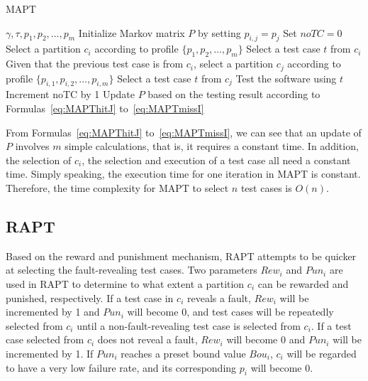 \documentclass[10pt,journal,compsoc]{IEEEtran}
\begin{document}
\begin{algorithm}
	\caption{MAPT}
	\label{alg:MAPT}
	\begin{algorithmic}[1]
		\renewcommand{\algorithmicrequire}{\textbf{Input:}}
		\renewcommand{\algorithmicensure}{\textbf{Output:}}
        
		\renewcommand{\algorithmicendwhile}{\algorithmicend\_\algorithmicwhile}
		\renewcommand{\algorithmicendfor}{\algorithmicend\_\algorithmicfor}
		\renewcommand{\algorithmicendif}{\algorithmicend\_\algorithmicif}
		\renewcommand{\algorithmicthen}{}
		\renewcommand{\algorithmicdo}{}
		\REQUIRE $\gamma, \tau, p_1, p_2, \ldots, p_m$
		\STATE Initialize Markov matrix $P$ by setting $p_{i,j} = p_j$
		\STATE Set $noTC = 0$
		\STATE Select a partition $c_i$ according to profile $\{p_1, p_2, \ldots, p_m\}$
		\STATE Select a test case $t$ from $c_i$
		\ELSE
		\STATE Given that the previous test case is from $c_i$, select a partition $c_j$ according to profile $\{p_{i,1}, p_{i,2}, \ldots, p_{i,m}\}$
		\STATE Select a test case $t$ from $c_j$
		\ENDIF
		\STATE Test the software using $t$
		\STATE Increment noTC by 1
		\STATE Update $P$ based on the testing result according to Formulas~\ref{eq:MAPThitJ} to~\ref{eq:MAPTmissI}
		\ENDWHILE
	\end{algorithmic}
\end{algorithm}

From Formulas~\ref{eq:MAPThitJ} to~\ref{eq:MAPTmissI}, we can see that an update of $P$ involves $m$ simple calculations, that is, it requires a constant time. In addition, the selection of $c_i$, the selection and execution of a test case all need a constant time. Simply speaking, the execution time for one iteration in MAPT is constant. Therefore, the time complexity for MAPT to select $n$ test cases is $O(n)$.

\subsection{RAPT}

Based on the reward and punishment mechanism, RAPT attempts to be quicker at selecting the fault-revealing test cases. Two parameters $Rew_i$ and $Pun_i$ are used in RAPT to determine to what extent a partition $c_i$ can be rewarded and punished, respectively. If a test case in $c_i$ reveals a fault, $Rew_i$ will be incremented by 1 and $Pun_i$ will become 0, and test cases will be repeatedly selected from $c_i$ until a non-fault-revealing test case is selected from $c_i$. If a test case selected from $c_i$ does not reveal a fault, $Rew_i$ will become 0 and $Pun_i$ will be incremented by 1. If $Pun_i$ reaches a preset bound value $Bou_i$, $c_i$ will be regarded to have a very low failure rate, and its corresponding $p_i$ will become 0.
\end{document}
